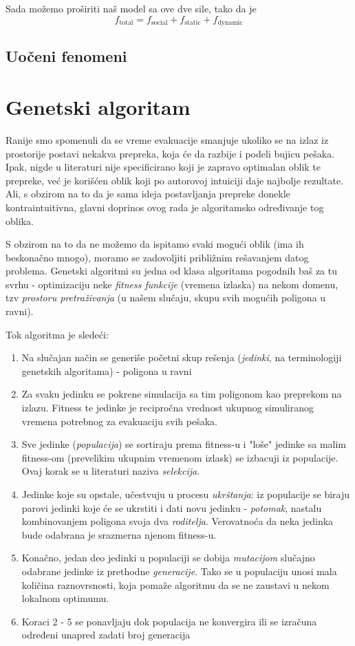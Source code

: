 \documentclass[12pt]{article}
\begin{document}
	Sada možemo proširiti naš model sa ove dve sile, tako da je
	$$
		f_\text{total} = f_\text{social} + f_\text{static} + f_\text{dynamic}
	$$
	
	     
    \subsection{Uočeni fenomeni}
    
    \label{fenomeni}

\section{Genetski algoritam}\label{GA}

Ranije smo spomenuli da se vreme evakuacije smanjuje ukoliko se na izlaz iz prostorije postavi nekakva prepreka, koja će da razbije i podeli bujicu pešaka. Ipak, nigde u literaturi nije specificirano koji je zapravo optimalan oblik te prepreke, već je korišćen oblik koji po autorovoj intuiciji daje najbolje rezultate. Ali, s obzirom na to da je sama ideja postavljanja prepreke donekle kontraintuitivna, glavni doprinos ovog rada je algoritamsko određivanje tog oblika.

S obzirom na to da ne možemo da ispitamo svaki mogući oblik (ima ih beskonačno mnogo), moramo se zadovoljiti približnim rešavanjem datog problema. Genetski algoritmi su jedna od klasa algoritama pogodnih baš za tu svrhu - optimizaciju neke \emph{fitness funkcije} (vremena izlaska) na nekom domenu, tzv \emph{prostoru pretraživanja} (u našem slučaju, skupu svih mogućih poligona u ravni).

Tok algoritma je sledeći:
\begin{enumerate}
\item Na slučajan način se generiše početni skup rešenja (\emph{jedinki}, na terminologiji genetskih algoritama) - poligona u ravni
\item Za svaku jedinku se pokrene simulacija sa tim poligonom kao preprekom na izlazu. Fitness te jedinke je recipročna vrednost ukupnog simuliranog vremena potrebnog za evakuaciju svih pešaka.
\item Sve jedinke (\emph{populacija}) se sortiraju prema fitness-u i "loše" jedinke sa malim fitness-om (prevelikim ukupnim vremenom izlask) se izbacuji iz populacije. Ovaj korak se u literaturi naziva \emph{selekcija}.
\item Jedinke koje su opstale, učestvuju u procesu \emph{ukrštanja}: iz populacije se biraju parovi jedinki koje će se ukrstiti i dati novu jedinku - \emph{potomak}, nastalu kombinovanjem poligona svoja dva \emph{roditelja}. Verovatnoća da neka jedinka bude odabrana je srazmerna njenom fitness-u.
\item Konačno, jedan deo jedinki u populaciji se dobija \emph{mutacijom} slučajno odabrane jedinke iz prethodne \emph{generacije}. Tako se u populaciju unosi mala količina raznovrsnosti, koja pomaže algoritmu da se ne zaustavi u nekom lokalnom optimumu.
\item Koraci 2 - 5 se ponavljaju dok populacija ne konvergira ili se izračuna određeni unapred zadati broj generacija
\end{enumerate}
\end{document}
